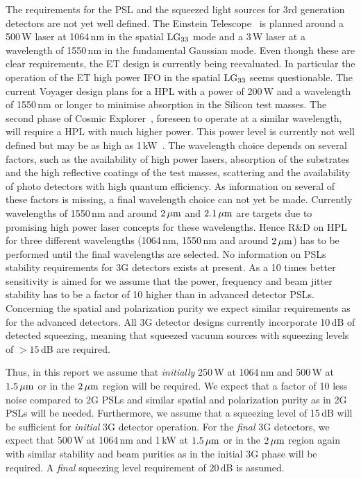 The requirements for the PSL and the squeezed light sources for 3rd generation detectors are not yet well defined. The Einstein Telescope~\cite{ET2011} is planned around a 500\,W laser at 1064\,nm in the spatial $\rm LG_{33}$ mode and a 3\,W laser at a wavelength of 1550\,nm in the fundamental Gaussian mode.
Even though these are clear requirements, the ET design is currently being reevaluated. In particular the operation of the ET high power IFO in the spatial $\rm LG_{33}$ seems questionable. The current Voyager design plans for a HPL with a power of 200\,W and a wavelength of 1550\,nm or longer to minimise absorption in the Silicon test masses. The second phase of Cosmic Explorer~\cite{CosmicExplorer2017}, foreseen to operate at a similar wavelength, will require a HPL with much higher power. This power level is currently not well defined but may be as high as 1\,kW~\cite{GWADW2018,ISWP:2018}. The wavelength choice depends on several factors, such as the availability of high power lasers, absorption of the substrates and the high reflective coatings of the test masses, scattering and the availability of photo detectors with high quantum efficiency. As information on several of these factors is missing, a final wavelength choice can not yet be made. Currently wavelengths of 1550\,nm and around $\rm 2\, \mu m $ and $\rm 2.1\, \mu m $ are targets due to promising high power laser concepts for these wavelengths. Hence R\&D on HPL for three different wavelengths (1064\,nm, 1550\,nm and around $\rm 2\, \mu m $) has to be performed until the final wavelengths are selected. 
No information on PSLs stability requirements for 3G detectors exists at present. As a 10 times better sensitivity is aimed for we assume that the power, frequency and beam jitter stability has to be a factor of 10 higher than in advanced detector PSLs. Concerning the spatial and polarization purity we expect similar requirements as for the advanced detectors.
All 3G detector designs currently incorporate 10\,dB of detected squeezing, meaning that squeezed vacuum sources with squeezing levels of $> 15$\,dB are required.

Thus, in this report we assume that \emph{initially} 250\,W at 1064\,nm and 500\,W at  $ 1.5\, {\rm \mu m}$ or in the $ 2\, {\rm \mu m}$ region will be required. We expect that a factor of 10 less noise compared to 2G PSLs and similar spatial and polarization purity as in 2G PSLs will be needed. Furthermore, we assume that a squeezing level of 15\,dB will be sufficient for \emph{initial} 3G detector operation. For the \emph{final} 3G detectors, we expect that  500\,W at 1064\,nm and 1\,kW at  $ 1.5\, {\rm \mu m}$ or in the $ 2\, {\rm \mu m}$ region again with similar stability and beam purities as in the initial 3G phase will be required. A \emph{final} squeezing level requirement of 20\,dB is assumed.

